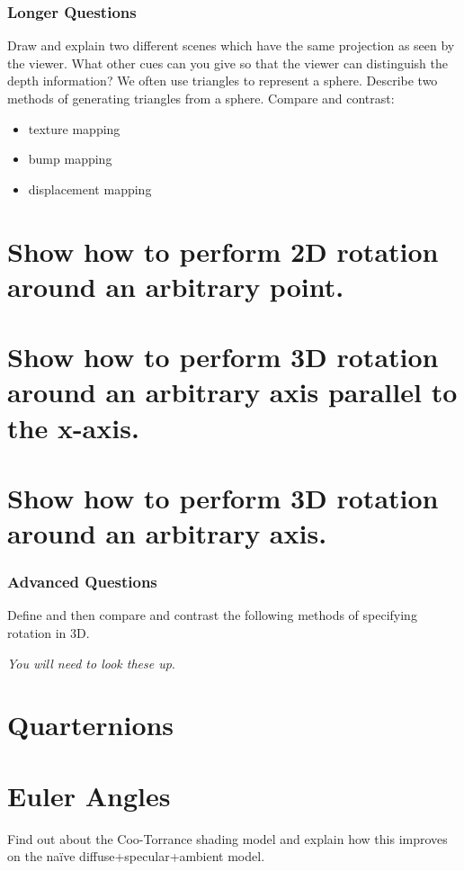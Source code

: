 \documentclass{supervision}
\begin{document}
\section*{Longer Questions}
\begin{questions}
    \question
    Draw and explain two different scenes which have the same projection as
seen by the viewer. What other cues can you give so that the viewer can distinguish the depth information?
    \question
    We often use triangles to represent a sphere. Describe two
methods of generating triangles from a sphere.
    \question
    Compare and contrast:
    \begin{itemize}
        \item{texture mapping}
        \item{bump mapping}
        \item{displacement mapping}
    \end{itemize}
    \question
    \begin{parts}
        \part{Show how to perform 2D rotation around an arbitrary point.}
        \part{Show how to perform 3D rotation around an arbitrary axis parallel to the x-axis.}
        \part{Show how to perform 3D rotation around an arbitrary axis.}
    \end{parts}
    
\end{questions}

\section*{Advanced Questions}
\begin{questions}
    \question
    Define and then compare and contrast the following methods of specifying rotation in 3D.
    
    \textit{You will need to look these up}.
    \begin{parts}
        \part{Quarternions}
        \part{Euler Angles}
    \end{parts}
    \question
    Find out about the Coo-Torrance shading model and explain how this improves on the naïve diffuse+specular+ambient model.

\end{questions}
\end{document}
